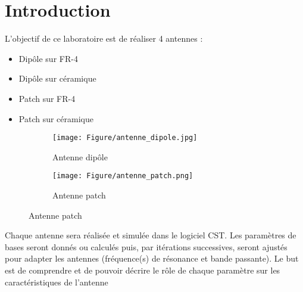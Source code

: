 \documentclass[Deriaz_Traiber_Labo02.tex]{subfiles}
\begin{document}
\chapter{Introduction}
L'objectif de ce laboratoire est de réaliser 4 antennes :
\begin{itemize}
\item Dipôle sur FR-4
\item Dipôle sur céramique
\item Patch sur FR-4
\item Patch sur céramique
\end{itemize}
\begin{figure}[H]
\centering
\begin{subfigure}{0.5\textwidth}
\centering
\texttt{[image: Figure/antenne\_dipole.jpg]}
\caption[caption]{Antenne dipôle\footnotemark}
\end{subfigure}
\begin{subfigure}{0.5\textwidth}
\centering
\texttt{[image: Figure/antenne\_patch.png]}
\caption[caption]{Antenne patch\footnotemark}
\end{subfigure}
\end{figure}


Chaque antenne sera réalisée et simulée dans le logiciel CST. Les paramètres de bases seront donnés ou calculés puis, par itérations successives, seront ajustés pour adapter les antennes (fréquence(s) de résonance et bande passante). Le but est de comprendre et de pouvoir décrire le rôle de chaque paramètre sur les caractéristiques de l'antenne
\end{document}
